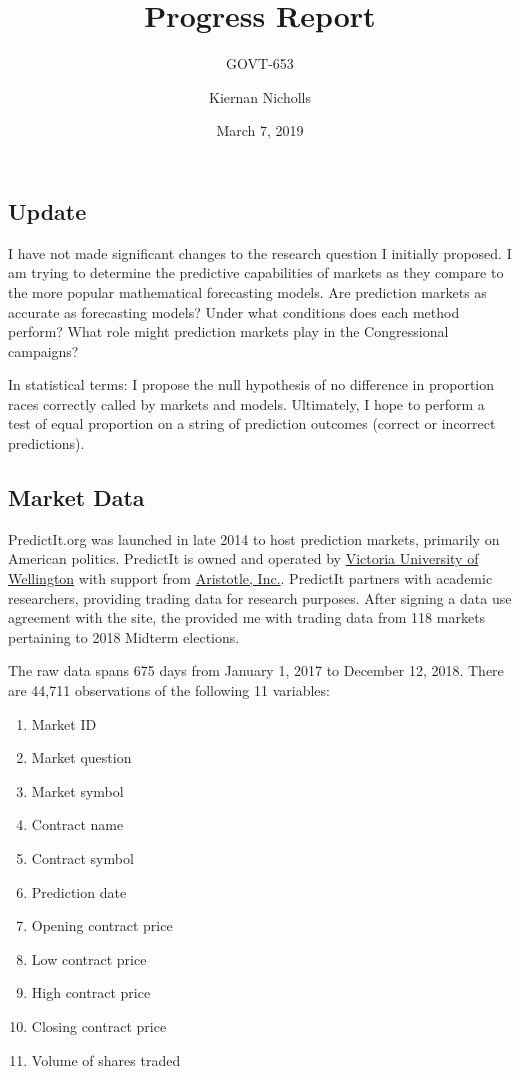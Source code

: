 \documentclass[]{article}
\title{Progress Report}
\subtitle{GOVT-653}
\author{Kiernan Nicholls}
\date{March 7, 2019}
\providecommand{\tightlist}{%
  \setlength{\itemsep}{0pt}\setlength{\parskip}{0pt}}
\begin{document}
\maketitle

\subsection{Update}\label{update}

I have not made significant changes to the research question I initially
proposed. I am trying to determine the predictive capabilities of
markets as they compare to the more popular mathematical forecasting
models. Are prediction markets as accurate as forecasting models? Under
what conditions does each method perform? What role might prediction
markets play in the Congressional campaigns?

In statistical terms: I propose the null hypothesis of no difference in
proportion races correctly called by markets and models. Ultimately, I
hope to perform a test of equal proportion on a string of prediction
outcomes (correct or incorrect predictions).

\subsection{Market Data}\label{market-data}

PredictIt.org was launched in late 2014 to host prediction markets,
primarily on American politics. PredictIt is owned and operated by
\href{https://www.victoria.ac.nz/}{Victoria University of Wellington}
with support from \href{http://aristotle.com/}{Aristotle, Inc.}.
PredictIt partners with academic researchers, providing trading data for
research purposes. After signing a data use agreement with the site, the
provided me with trading data from 118 markets pertaining to 2018
Midterm elections.

The raw data spans 675 days from January 1, 2017 to December 12, 2018.
There are 44,711 observations of the following 11 variables:

\begin{enumerate}
\def\labelenumi{\arabic{enumi}.}
\tightlist
\item
  Market ID
\item
  Market question
\item
  Market symbol
\item
  Contract name
\item
  Contract symbol
\item
  Prediction date
\item
  Opening contract price
\item
  Low contract price
\item
  High contract price
\item
  Closing contract price
\item
  Volume of shares traded
\end{enumerate}
\end{document}
